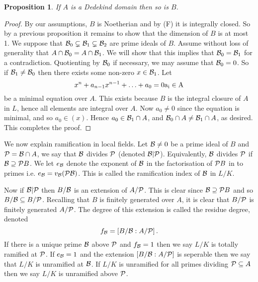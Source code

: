 \documentclass[11pt]{article} %
\newtheorem{prop}{Proposition}
\theoremstyle{remark}\newtheorem*{rem}{Remark}
\begin{document}
\begin{prop}
 If $A$ is a Dedekind domain then so is $B$.
\end{prop}
\begin{proof}
 By our assumptions, $B$ is Noetherian and by (F) it is integrally closed.
 So by a previous proposition it remains to show that the dimension of $B$ is at most 1.
 We suppose that ${\cal B}_0\subsetneq {\cal B}_1 \subsetneq {\cal B}_2$ are prime ideals of $B$.
 Assume without loss of generality that $A\cap {\cal B}_0 = A\cap {\cal B}_1$.
 We will show that this implies that ${\cal B}_0 = {\cal B}_1$ for a contradiction.
 Quotienting by ${\cal B}_0$ if necessary, we may assume that ${\cal B}_0= 0$.
 So if ${\cal B}_1\neq {\cal B}_0$ then there exists some non-zero $x \in {\cal B}_1$.
 Let \[
      x^n + a_{n-1}x^{n-1} + \ldots + a_0 = 0\rm{ a_i\in A}
     \]
be a minimal equation over $A$.
This exists because $B$ is the integral closure of $A$ in $L$, hence all elements are integral over $A$.
Now $a_0\neq 0$ since the equation is minimal, and so $a_0\in (x)$.
Hence $a_0\in {\cal B}_1\cap A$, and ${\cal B}_0\cap A \neq {\cal B}_1 \cap A$, as desired.
This completes the proof.
\end{proof}

We now explain ramification in local fields.
Let ${\cal B} \neq 0$ be a prime ideal of $B$ and ${\cal P} = {\cal B} \cap A$, we say that $\cal B$ divides $\cal P$ (denoted $\cal B | \cal P$).
Equivalently, $\cal B$ divides $\cal P$ if ${\cal B} \supseteq {\cal P} B$. 
We let $e_{\cal B}$ denote the exponent of $\cal B$ in the factorisation of ${\cal P} B$ in to primes i.e. $e_{\cal B} = v_{\cal B}({\cal PB})$.
 This is called the ramification index of $\cal B$ in $L/K$.
 
 Now if $\cal B|P$ then $B/\cal B$ is an extension of $A/\cal P$.
 This is clear since ${\cal B} \supseteq {\cal P}B$ and so $B/{\cal B} \subseteq B/\cal P$.
 Recalling that $B$ is finitely generated over $A$, it is clear that $B/{\cal P}$ is finitely generated $A/\cal P$.
 The degree of this extension is called the residue degree, denoted
 \[
  f_{\cal B} =\left[ B/{\cal B} : A/{\cal P}\right].
 \]
If there is a unique prime $\cal B$ above $\cal P$ and $f_{\cal B} = 1$ then we say $L/K$ is totally ramified at $\cal P$.
If $e_{\cal B} = 1$ and the extension $\left[ B/{\cal B}:A/{\cal P}\right]$ is seperable then we say that $L/K$ is unramified at $\cal B$.
If $L/K$ is unramified for all primes dividing ${\cal P} \subseteq A$ then we say $L/K$ is unramified above $\cal P$.
\end{document}
